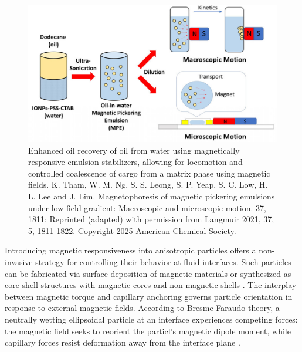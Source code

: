 \begin{figure}
    \centering
    \includegraphics[scale = 1.5]{figures/introduction/magnetophoresis_emulsion.jpeg}
    \caption{Enhanced oil recovery of oil from water using magnetically responsive emulsion stabilizers, allowing for 
             locomotion and controlled coalescence of cargo from a matrix phase using magnetic fields. \cite{tham_magnetophoresis_2021} 
             K. Tham, W. M. Ng, S. S. Leong, S. P. Yeap, S. C. Low, H. L. Lee and J. Lim. Magnetophoresis of magnetic pickering 
             emulsions under low field gradient: Macroscopic and microscopic motion. 37, 1811: Reprinted (adapted) with permission from 
             Langmuir 2021, 37, 5, 1811-1822. Copyright 2025 American Chemical Society.}
    \label{fig:magnetophoresis_droplet}
\end{figure}

Introducing magnetic responsiveness into anisotropic particles offers a non-invasive strategy for controlling their behavior at fluid interfaces. Such particles can be fabricated via surface deposition of 
magnetic materials or synthesized as core-shell structures with magnetic cores and non-magnetic shells \cite{fei_magneto-capillary_2020, nakayama_stimuli-responsive_2018}. The interplay between magnetic 
torque and capillary anchoring governs particle orientation in response to external magnetic fields. According to Bresme-Faraudo theory, a neutrally wetting ellipsoidal particle at an interface experiences 
competing forces: the magnetic field seeks to reorient the particl's magnetic dipole moment, while capillary forces resist deformation away from the interface plane 
\cite{bresme_orientational_2007, davies_interface_2014}.

